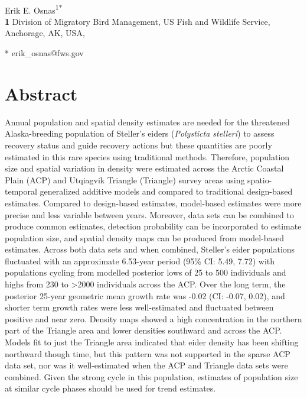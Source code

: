 \documentclass[
  10pt,
  letterpaper,
]{article}
\begin{document}
\vspace*{0.2in}

\begin{flushleft}
{\Large
\textbf{} %
}
\newline
\\
Erik E. Osnas\textsuperscript{1*}
\\
\bigskip
\textbf{1} Division of Migratory Bird Management, US Fish and Wildlife
Service, Anchorage, AK, USA, 
\bigskip

* erik\_osnas@fws.gov

\end{flushleft}

\section*{Abstract}
Annual population and spatial density estimates are needed for the
threatened Alaska-breeding population of Steller's eiders
(\emph{Polysticta stelleri}) to assess recovery status and guide
recovery actions but these quantities are poorly estimated in this rare
species using traditional methods. Therefore, population size and
spatial variation in density were estimated across the Arctic Coastal
Plain (ACP) and Utqiagvik Triangle (Triangle) survey areas using
spatio-temporal generalized additive models and compared to traditional
design-based estimates. Compared to design-based estimates, model-based
estimates were more precise and less variable between years. Moreover,
data sets can be combined to produce common estimates, detection
probability can be incorporated to estimate population size, and spatial
density maps can be produced from model-based estimates. Across both
data sets and when combined, Steller's eider populations fluctuated with
an approximate 6.53-year period (95\% CI: 5.49, 7.72) with populations
cycling from modelled posterior lows of 25 to 500 individuals and highs
from 230 to \textgreater2000 individuals across the ACP. Over the long
term, the posterior 25-year geometric mean growth rate was -0.02 (CI:
-0.07, 0.02), and shorter term growth rates were less well-estimated and
fluctuated between positive and near zero. Density maps showed a high
concentration in the northern part of the Triangle area and lower
densities southward and across the ACP. Models fit to just the Triangle
area indicated that eider density has been shifting northward though
time, but this pattern was not supported in the sparse ACP data set, nor
was it well-estimated when the ACP and Triangle data sets were combined.
Given the strong cycle in this population, estimates of population size
at similar cycle phases should be used for trend estimates.
\end{document}
